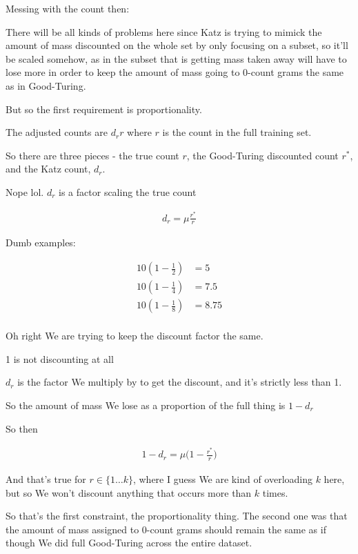 \documentclass{article}
\begin{document}
		Messing with the count then:
		
		There will be all kinds of problems here since Katz is trying to mimick the amount of mass discounted on the whole set by only focusing on a subset, so it'll be scaled somehow, as in the subset that is getting mass taken away will have to lose more in order to keep the amount of mass going to 0-count grams the same as in Good-Turing.
		
		But so the first requirement is proportionality.
		
		The adjusted counts are $d_r r$ where $r$ is the count in the full training set.
		
		So there are three pieces - the true count $r$, the Good-Turing discounted count $r^*$, and the Katz count, $d_r$.
		
		Nope lol. $d_r$ is a factor scaling the true count
		
		\begin{align}
			d_r = \mu \frac{r^*}{r}
		\end{align}
			
		Dumb examples:
		
		\begin{align}
			10(1-\frac{1}{2}) &= 5\\
			10(1-\frac{1}{4}) &= 7.5\\
			10(1-\frac{1}{8}) &= 8.75\\
		\end{align}
		
		Oh right We are trying to keep the discount factor the same.
		
		1 is not discounting at all
		
		$d_r$ is the factor We multiply by to get the discount, and it's strictly less than 1.
		
		So the amount of mass We lose as a proportion of the full thing is $1-d_r$
		
		So then
		
		\begin{align}
			1-d_r = \mu\bigg(1-\frac{r^*}{r} \bigg)
		\end{align}
		
		And that's true for $r\in\{ 1\ldots k\}$, where I guess We are kind of overloading $k$ here, but so We won't discount anything that occurs more than $k$ times.
		
		So that's the first constraint, the proportionality thing. The second one was that the amount of mass assigned to 0-count grams should remain the same as if though We did full Good-Turing across the entire dataset.
		
\end{document}
